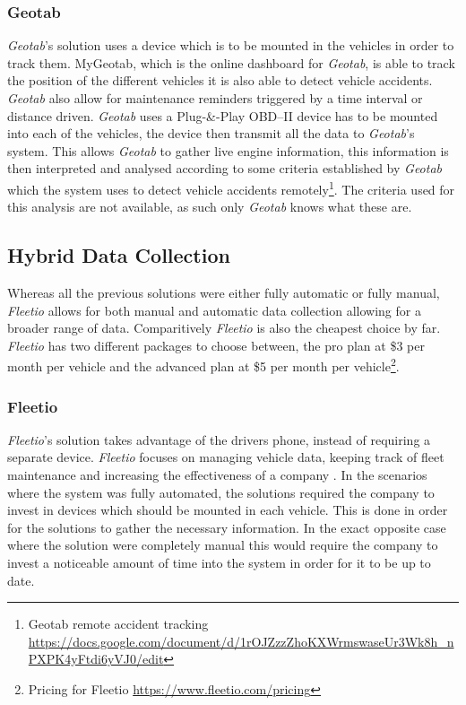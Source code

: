 \subsubsection{Geotab}
\textit{Geotab}'s solution uses a device which is to be mounted in the vehicles in order to track them. MyGeotab, which is the online dashboard for \textit{Geotab}, is able to track the position of the different vehicles it is also able to detect vehicle accidents\cite{geotab}.
\textit{Geotab} also allow for maintenance reminders triggered by a time interval or distance driven.
\textit{Geotab} uses a Plug-\&-Play OBD--II device has to be mounted into each of the vehicles, the device then transmit all the data to \textit{Geotab}'s system.
This allows \textit{Geotab} to gather live engine information, this information is then interpreted and analysed according to some criteria established by \textit{Geotab} which the system uses to detect vehicle accidents remotely\footnote{Geotab remote accident tracking \url{https://docs.google.com/document/d/1rOJZzzZhoKXWrmswaseUr3Wk8h_nPXPK4yFtdi6yVJ0/edit}}.
The criteria used for this analysis are not available, as such only \textit{Geotab} knows what these are.
\subsection{Hybrid Data Collection}
Whereas all the previous solutions were either fully automatic or fully manual, \textit{Fleetio} allows for both manual and automatic data collection allowing for a broader range of data.
Comparitively \textit{Fleetio} is also the cheapest choice by far. 
\textit{Fleetio} has two different packages to choose between, the pro plan at \$3 per month per vehicle and the advanced plan at \$5 per month per vehicle\footnote{Pricing for Fleetio \url{https://www.fleetio.com/pricing}}.
\subsubsection{Fleetio}
\textit{Fleetio}'s solution takes advantage of the drivers phone, instead of requiring a separate device. 
\textit{Fleetio} focuses on managing vehicle data, keeping track of fleet maintenance and increasing the effectiveness of a company \cite{fleetio}.
In the scenarios where the system was fully automated, the solutions required the company to invest in devices which should be mounted in each vehicle.
This is done in order for the solutions to gather the necessary information.
In the exact opposite case where the solution were completely manual this would require the company to invest a noticeable amount of time into the system in order for it to be up to date.

